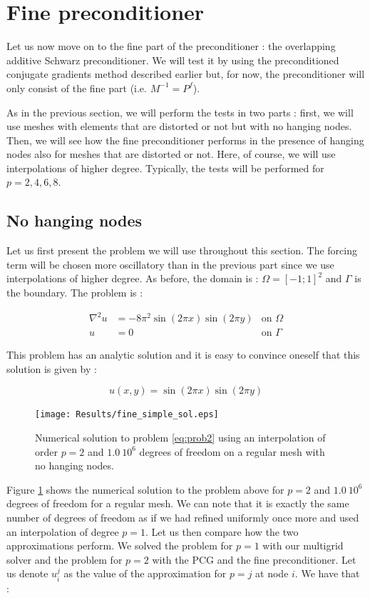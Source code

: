 \section{Fine preconditioner}
Let us now move on to the fine part of the preconditioner : the overlapping additive Schwarz preconditioner. We will test it by using the preconditioned conjugate gradients method described earlier but, for now, the preconditioner will only consist of the fine part (i.e. $M^{-1} = P^f$).

As in the previous section, we will perform the tests in two parts : first, we will use meshes with elements that are distorted or not but with no hanging nodes. Then, we will see how the fine preconditioner performs in the presence of hanging nodes also for meshes that are distorted or not. Here, of course, we will use interpolations of higher degree. Typically, the tests will be performed for $p=2,4,6,8$.

\subsection{No hanging nodes}

Let us first present the problem we will use throughout this section. The forcing term will be chosen more oscillatory than in the previous part since we use interpolations of higher degree. As before, the domain is : $\Omega = [-1;1]^2$ and $\Gamma$ is the boundary. The problem is : 

\begin{align}
\nabla^2 u &= -8\pi^2\sin(2\pi x)\sin(2\pi y) &\text{on $\Omega$} \label{eq:prob2}\\
u &= 0  &\text{on $\Gamma$}
\end{align}

This problem has an analytic solution and it is easy to convince oneself that this solution is given by : 

$$ u(x,y) = \sin(2\pi x)\sin(2\pi y)$$

\begin{figure}
\centering
\texttt{[image: Results/fine\_simple\_sol.eps]}
\caption{Numerical solution to problem \ref{eq:prob2} using an interpolation of order $p=2$ and $1.0\:10^6$ degrees of freedom on a regular mesh with no hanging nodes.}
\label{fine_simple_sol}
\end{figure}

Figure \ref{fine_simple_sol} shows the numerical solution to the problem above for $p=2$ and $1.0\:10^6$ degrees of freedom for a regular mesh. We can note that it is exactly the same number of degrees of freedom as if we had refined uniformly once more and used an interpolation of degree $p=1$. Let us then compare how the two approximations perform. We solved the problem for $p=1$ with our multigrid solver and the problem for $p=2$ with the PCG and the fine preconditioner. Let us denote $u^j_i$ as the value of the approximation for $p=j$ at node $i$. We have that : 

